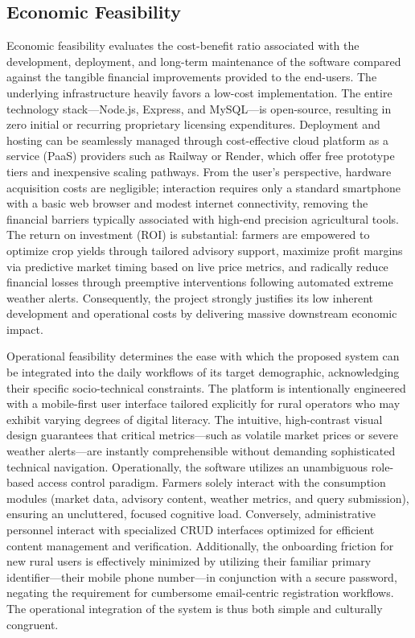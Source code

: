 \subsection{Economic Feasibility}
Economic feasibility evaluates the cost-benefit ratio associated with the development, deployment, and long-term maintenance of the software compared against the tangible financial improvements provided to the end-users. The underlying infrastructure heavily favors a low-cost implementation. The entire technology stack—Node.js, Express, and MySQL—is open-source, resulting in zero initial or recurring proprietary licensing expenditures. Deployment and hosting can be seamlessly managed through cost-effective cloud platform as a service (PaaS) providers such as Railway or Render, which offer free prototype tiers and inexpensive scaling pathways. From the user's perspective, hardware acquisition costs are negligible; interaction requires only a standard smartphone with a basic web browser and modest internet connectivity, removing the financial barriers typically associated with high-end precision agricultural tools. The return on investment (ROI) is substantial: farmers are empowered to optimize crop yields through tailored advisory support, maximize profit margins via predictive market timing based on live price metrics, and radically reduce financial losses through preemptive interventions following automated extreme weather alerts. Consequently, the project strongly justifies its low inherent development and operational costs by delivering massive downstream economic impact.

Operational feasibility determines the ease with which the proposed system can be integrated into the daily workflows of its target demographic, acknowledging their specific socio-technical constraints. The platform is intentionally engineered with a mobile-first user interface tailored explicitly for rural operators who may exhibit varying degrees of digital literacy. The intuitive, high-contrast visual design guarantees that critical metrics—such as volatile market prices or severe weather alerts—are instantly comprehensible without demanding sophisticated technical navigation. Operationally, the software utilizes an unambiguous role-based access control paradigm. Farmers solely interact with the consumption modules (market data, advisory content, weather metrics, and query submission), ensuring an uncluttered, focused cognitive load. Conversely, administrative personnel interact with specialized CRUD interfaces optimized for efficient content management and verification. Additionally, the onboarding friction for new rural users is effectively minimized by utilizing their familiar primary identifier—their mobile phone number—in conjunction with a secure password, negating the requirement for cumbersome email-centric registration workflows. The operational integration of the system is thus both simple and culturally congruent.

